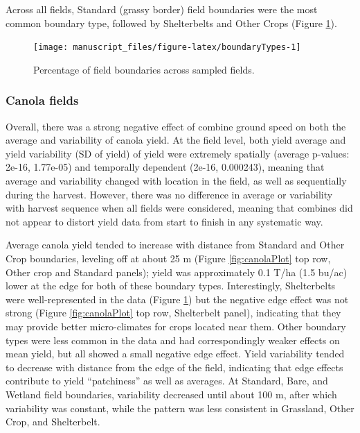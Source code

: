 \documentclass[]{elsarticle} %
\begin{document}
Across all fields, Standard (grassy border) field boundaries were the most common boundary type, followed by Shelterbelts and Other Crops (Figure \ref{fig:boundaryTypes}).

\begin{figure}
\texttt{[image: manuscript\_files/figure-latex/boundaryTypes-1]} \caption{Percentage of field boundaries across sampled fields.}\label{fig:boundaryTypes}
\end{figure}

\hypertarget{canola-fields}{%
\subsubsection{Canola fields}\label{canola-fields}}

Overall, there was a strong negative effect of combine ground speed on both the average and variability of canola yield.
At the field level, both yield average and yield variability (SD of yield) of yield were extremely spatially (average p-values: 2e-16, 1.77e-05) and temporally dependent (2e-16, 0.000243), meaning that average and variability changed with location in the field, as well as sequentially during the harvest.
However, there was no difference in average or variability with harvest sequence when all fields were considered, meaning that combines did not appear to distort yield data from start to finish in any systematic way.

Average canola yield tended to increase with distance from Standard and Other Crop boundaries, leveling off at about 25 m (Figure \ref{fig:canolaPlot} top row, Other crop and Standard panels); yield was approximately 0.1 T/ha (1.5 bu/ac) lower at the edge for both of these boundary types.
Interestingly, Shelterbelts were well-represented in the data (Figure \ref{fig:boundaryTypes}) but the negative edge effect was not strong (Figure \ref{fig:canolaPlot} top row, Shelterbelt panel), indicating that they may provide better micro-climates for crops located near them.
Other boundary types were less common in the data and had correspondingly weaker effects on mean yield, but all showed a small negative edge effect.
Yield variability tended to decrease with distance from the edge of the field, indicating that edge effects contribute to yield ``patchiness'' as well as averages.
At Standard, Bare, and Wetland field boundaries, variability decreased until about 100 m, after which variability was constant, while the pattern was less consistent in Grassland, Other Crop, and Shelterbelt.
\end{document}
